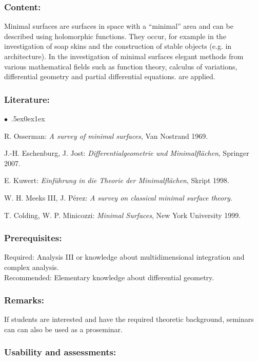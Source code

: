 \documentclass[a4paper,10pt]{article}
\renewenvironment{itemize}{\begin{list}{$\bullet$\ }{\itemsep.5ex\setlength{\topsep}{0.5\itemsep}\parsep0ex\labelsep1ex\settowidth{\labelwidth}{$\bullet$\ }\setlength{\leftmargin}{\labelwidth}\addtolength{\leftmargin}{3ex}\addtolength{\leftmargin}{\labelsep}}}{\end{list}}
\begin{document}
\subsubsection*{\large
    Content:
}
Minimal surfaces are surfaces in space with a “minimal” area and can be described using holomorphic functions. They occur, for example in the investigation of soap skins and the construction of stable objects (e.g. in architecture). In the investigation of minimal surfaces elegant methods from various mathematical fields such as function theory, calculus of variations, differential geometry and partial differential equations. are applied.
\subsubsection*{\large
    Literature:
}
\begin{itemize}
\item
R. Osserman: \emph{A survey of minimal surfaces}, Van Nostrand 1969. 
\item
J.-H. Eschenburg, J. Jost: \emph{Differentialgeometrie und Minimalflächen}, Springer 2007.
\item
E. Kuwert: \emph{Einführung in die Theorie der Minimalflächen}, Skript 1998.
\item
W. H. Meeks III, J. Pérez: \emph{A survey on classical minimal surface theory}.
\item
T. Colding, W. P. Minicozzi: \emph{Minimal Surfaces}, New York University 1999.
\end{itemize}
\subsubsection*{\large
    Prerequisites:
}
Required: Analysis III or knowledge about multidimensional integration and complex analysis. \\ Recommended: Elementary knowledge about differential geometry.
\subsubsection*{\large
    Remarks:
}
If students are interested and have the required theoretic background, seminars can can also be used as a proseminar. 

\subsubsection*{\large
    Usability and assessments:
}
\end{document}
